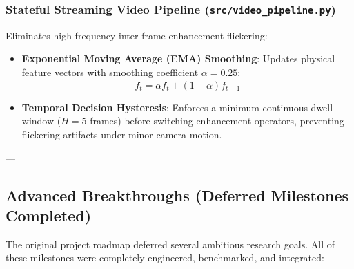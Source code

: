 \documentclass[10pt,a4paper]{article}
\begin{document}
\subsubsection{Stateful Streaming Video Pipeline (\texttt{src/video\_pipeline.py})}
Eliminates high-frequency inter-frame enhancement flickering:
\begin{itemize}[leftmargin=*]
    \item \textbf{Exponential Moving Average (EMA) Smoothing}: Updates physical feature vectors with smoothing coefficient $\alpha = 0.25$:
    \begin{equation}
    \bar{f}_t = \alpha f_t + (1 - \alpha) \bar{f}_{t-1}
    \end{equation}
    \item \textbf{Temporal Decision Hysteresis}: Enforces a minimum continuous dwell window ($H = 5$ frames) before switching enhancement operators, preventing flickering artifacts under minor camera motion.
\end{itemize}

---

\subsection{Advanced Breakthroughs (Deferred Milestones Completed)}
The original project roadmap deferred several ambitious research goals. All of these milestones were completely engineered, benchmarked, and integrated:
\end{document}
